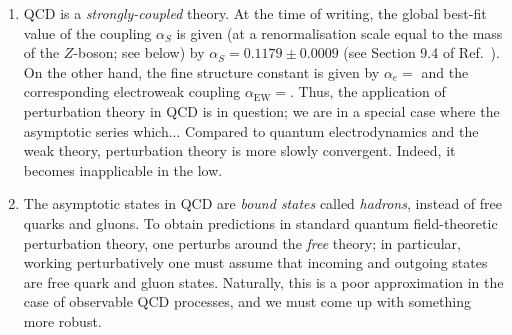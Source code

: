 \documentclass[withindex,glossary]{cam-thesis}
\begin{document}
\begin{enumerate}[label = (\arabic*)]
\item QCD is a \textit{strongly-coupled} theory. At the time of writing, the global best-fit value of the coupling $\alpha_S$ is given (at a renormalisation scale equal to the mass of the $Z$-boson; see below) by $\alpha_S = 0.1179 \pm 0.0009$ (see Section 9.4 of Ref.~\cite{ParticleDataGroup:2022pth}). On the other hand, the fine structure constant is given by $\alpha_e = $ and the corresponding electroweak coupling $\alpha_{\text{EW}} = $. Thus, the application of perturbation theory in QCD is in question; we are in a special case where the asymptotic series which... Compared to quantum electrodynamics and the weak theory, perturbation theory is more slowly convergent. Indeed, it becomes inapplicable in the low.
  
\item The asymptotic states in QCD are \textit{bound states} called \textit{hadrons}, instead of free quarks and gluons.  To obtain predictions in standard quantum field-theoretic perturbation theory, one perturbs around the \textit{free} theory; in particular, working perturbatively one must assume that incoming and outgoing states are free quark and gluon states. Naturally, this is a poor approximation in the case of observable QCD processes, and we must come up with something more robust.
\end{enumerate}
\end{document}
